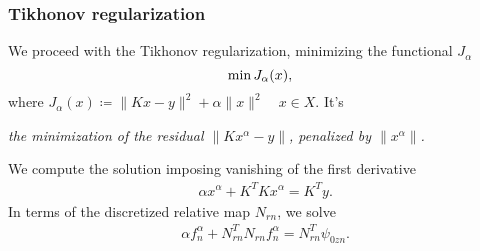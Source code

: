 \documentclass[10pt]{beamer}
\theoremstyle{plain}
\theoremstyle{plain}
\begin{document}
\begin{frame}
 \frametitle{Tikhonov regularization}
We proceed with the {\color{blue}Tikhonov regularization}, minimizing the functional $J_\alpha$
 \begin{equation}
  \textup{min}\,J_\alpha(x),
 \end{equation}
where $J_\alpha(x)\coloneqq\|Kx - y\|^2 + \alpha\|x\|^2\quad x\in X$. It's
\begin{center}
\emph{
the minimization of the residual $\|Kx^{\alpha} - y\|$,
penalized by 
$\|x^\alpha\|$.
}
\end{center}
We compute the solution imposing vanishing of the first derivative
\begin{align}
 &\alpha x^{\alpha} + K^TKx^{\alpha} = K^Ty.
\end{align}
In terms of the discretized relative map $N_{rn}$, we solve
\begin{align}
 &\alpha f_n^{\alpha} + N_{rn}^TN_{rn}f_n^{\alpha} = N_{rn}^T\psi_{0zn}\label{eq:tikh-reg-lsm-discrete}.
\end{align}

\end{frame}
\end{document}
